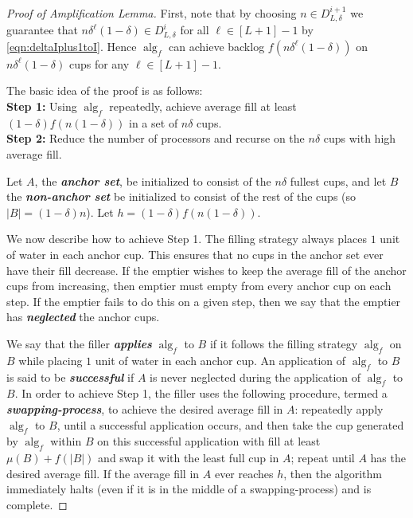 \documentclass[twocolumn]{article}[10pt]
\newcommand{\defn}[1]{{\textit{\textbf{\boldmath #1}}}\xspace}
\DeclareMathOperator{\alg}{\text{alg}}
\begin{document}
\begin{proof}[Proof of Amplification Lemma]
  First, note that by choosing $n \in D^{i+1}_{L, \delta}$ we
  guarantee that $n\delta^\ell(1-\delta) \in D^i_{L, \delta}$
  for all $\ell \in [L+1]-1$ by \eqref{eqn:deltaIplus1toI}. Hence $\alg_f$ can achieve backlog
  $f(n\delta^\ell(1-\delta))$ on $n\delta^\ell(1-\delta)$ cups
  for any $\ell \in [L+1]-1$.

  The basic idea of the proof is as follows:\\
  \textbf{Step 1:} Using $\alg_f$ repeatedly, achieve average fill at least
  $(1-\delta) f(n(1-\delta))$ in a set of $n\delta$ cups. \\
  \textbf{Step 2:} Reduce the number of processors and recurse
  on the $n\delta$ cups with high average fill.

  Let $A$, the \defn{anchor set}, be initialized to consist of the $n\delta$
  fullest cups, and let $B$ the \defn{non-anchor set} be initialized to consist
  of the rest of the cups (so $|B| = (1-\delta)n$). Let $h =
  (1-\delta)f(n(1-\delta)).$

  We now describe how to achieve Step 1.
  The filling strategy always places $1$ unit of water in each anchor cup. This
  ensures that no cups in the anchor set ever have their fill
  decrease. If the emptier wishes to keep the average fill of the
  anchor cups from increasing, then emptier must empty from every
  anchor cup on each step. If the emptier fails to do this on a
  given step, then we say that the emptier has \defn{neglected}
  the anchor cups. 

  We say that the filler \defn{applies} $\alg_f$ to $B$ if it follows
  the filling strategy $\alg_f$ on $B$ while placing $1$ unit of water
  in each anchor cup. An application of $\alg_f$ to $B$ is said to be
  \defn{successful} if $A$ is never neglected during the
  application of $\alg_f$ to $B$. In order to achieve Step 1, the
  filler uses the following procedure, termed a
  \defn{swapping-process}, to achieve the desired average fill in
  $A$: repeatedly apply $\alg_f$ to $B$, until a successful
  application occurs, and then take the cup generated by $\alg_f$
  within $B$ on this successful application with fill at least
  $\mu(B) + f(|B|)$ and swap it with the least full cup in $A$;
  repeat until $A$ has the desired average fill. If the average
  fill in $A$ ever reaches $h$, then the algorithm immediately
  halts (even if it is in the middle of a swapping-process) and
  is complete.
  

\end{proof}
\end{document}
